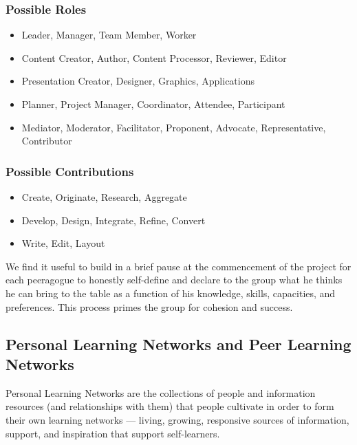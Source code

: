 \subsubsection{\textbf{Possible Roles}}

\begin{itemize}
\item
  Leader, Manager, Team Member, Worker
\item
  Content Creator, Author, Content Processor, Reviewer, Editor
\item
  Presentation Creator, Designer, Graphics, Applications
\item
  Planner, Project Manager, Coordinator, Attendee, Participant
\item
  Mediator, Moderator, Facilitator, Proponent, Advocate, Representative,
  Contributor
\end{itemize}

\subsubsection{\textbf{Possible Contributions}}

\begin{itemize}
\item
  Create, Originate, Research, Aggregate
\item
  Develop, Design, Integrate, Refine, Convert
\item
  Write, Edit, Layout
\end{itemize}

We find it useful to build in a brief pause at the commencement of the
project for each peeragogue to honestly self-define and declare to the
group what he thinks he can bring to the table as a function of his
knowledge, skills, capacities, and preferences. This process primes the
group for cohesion and success.

\subsection{Personal Learning Networks and Peer Learning Networks}

Personal Learning Networks are the collections of people and information
resources (and relationships with them) that people cultivate in order
to form their own learning networks --- living, growing, responsive
sources of information, support, and inspiration that support
self-learners.

